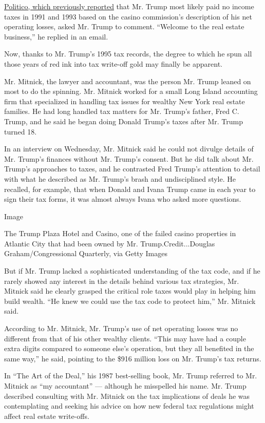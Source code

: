 \href{http://www.politico.com/story/2016/06/donald-trump-no-taxes-224498}{Politico,
which previously reported} that Mr. Trump most likely paid no income
taxes in 1991 and 1993 based on the casino commission's description of
his net operating losses, asked Mr. Trump to comment. ``Welcome to the
real estate business,'' he replied in an email.

Now, thanks to Mr. Trump's 1995 tax records, the degree to which he spun
all those years of red ink into tax write-off gold may finally be
apparent.

Mr. Mitnick, the lawyer and accountant, was the person Mr. Trump leaned
on most to do the spinning. Mr. Mitnick worked for a small Long Island
accounting firm that specialized in handling tax issues for wealthy New
York real estate families. He had long handled tax matters for Mr.
Trump's father, Fred C. Trump, and he said he began doing Donald Trump's
taxes after Mr. Trump turned 18.

In an interview on Wednesday, Mr. Mitnick said he could not divulge
details of Mr. Trump's finances without Mr. Trump's consent. But he did
talk about Mr. Trump's approaches to taxes, and he contrasted Fred
Trump's attention to detail with what he described as Mr. Trump's brash
and undisciplined style. He recalled, for example, that when Donald and
Ivana Trump came in each year to sign their tax forms, it was almost
always Ivana who asked more questions.

Image

The Trump Plaza Hotel and Casino, one of the failed casino properties in
Atlantic City that had been owned by Mr. Trump.Credit...Douglas
Graham/Congressional Quarterly, via Getty Images

But if Mr. Trump lacked a sophisticated understanding of the tax code,
and if he rarely showed any interest in the details behind various tax
strategies, Mr. Mitnick said he clearly grasped the critical role taxes
would play in helping him build wealth. ``He knew we could use the tax
code to protect him,'' Mr. Mitnick said.

According to Mr. Mitnick, Mr. Trump's use of net operating losses was no
different from that of his other wealthy clients. ``This may have had a
couple extra digits compared to someone else's operation, but they all
benefited in the same way,'' he said, pointing to the \$916 million loss
on Mr. Trump's tax returns.

In ``The Art of the Deal,'' his 1987 best-selling book, Mr. Trump
referred to Mr. Mitnick as ``my accountant'' --- although he misspelled
his name. Mr. Trump described consulting with Mr. Mitnick on the tax
implications of deals he was contemplating and seeking his advice on how
new federal tax regulations might affect real estate write-offs.

